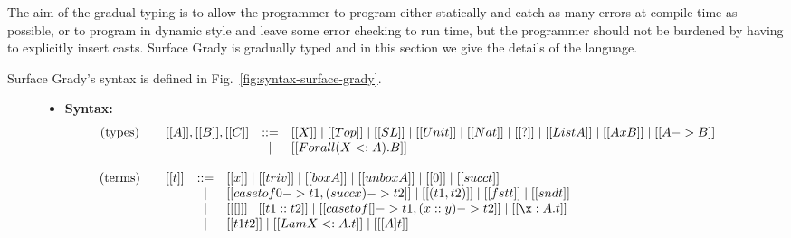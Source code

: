 The aim of the gradual typing is to allow the programmer to program
either statically and catch as many errors at compile time as
possible, or to program in dynamic style and leave some error checking
to run time, but the programmer should not be burdened by having to
explicitly insert casts.  Surface Grady is gradually typed and in this
section we give the details of the language.

Surface Grady's syntax is defined in
Fig.~\ref{fig:syntax-surface-grady}.  
\begin{figure}
  \small
  \begin{mdframed}
    \begin{itemize}
    \item[] \textbf{Syntax:}
      \[
      \begin{array}{cl}
        \begin{array}{l}
          \text{(types)}\\\\
        \end{array}     &
        \begin{array}{lcl}
          [[A]],[[B]],[[C]] & ::= & [[X]] \mid [[Top]] \mid [[SL]] \mid [[Unit]] \mid [[Nat]] \mid [[?]] \mid [[List A]] \mid [[A x B]] \mid [[A -> B]] \\ & \mid &[[Forall (X <: A).B]]\\
        \end{array}\\\\
        
        
        \begin{array}{l}
          \text{(terms)}\\\\\\\\
        \end{array}     &
        \begin{array}{lcl}
          [[t]] & ::= & [[x]] \mid [[triv]] \mid [[box A]] \mid [[unbox A]] \mid [[0]] \mid [[succ t]] \\ & \mid & [[case t of 0 -> t1, (succ x) -> t2]] \mid [[(t1 , t2)]] \mid [[fst t]] \mid [[snd t]] \\ & \mid & [[ [] ]] \mid [[t1 :: t2]] \mid [[case t of [] -> t1, (x :: y) -> t2]] \mid [[\x : A.t]] \\ & \mid & [[t1 t2]] \mid [[Lam X <: A.t]] \mid [[ [ A ] t ]]\\
        \end{array}\\\\
        

\end{array}\]
\end{itemize}
\end{mdframed}
\end{figure}
